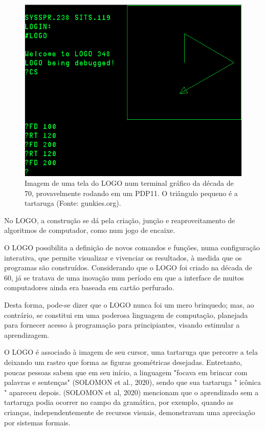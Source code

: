 \begin{figure}[htb]
\begin{minipage}[b]{0.4\linewidth}
                \includegraphics[width=1.0\linewidth]{../../../imagens/logo-PDP11.png}
                \caption{Imagem de uma tela do LOGO num terminal gráfico da década de 70, provavelmente rodando em um PDP11. O triângulo pequeno é a tartaruga (Fonte: gunkies.org).}
                \label{ca83b217b58f57e503ff496c6c6f47bee5dc77cd}
\end{minipage}
\hspace{0.5cm}
\end{figure}



No LOGO, a construção se dá pela criação, junção e reaproveitamento de algoritmos de computador, como num jogo de encaixe.

O LOGO possibilita a definição de novos comandos e funções, numa configuração interativa, que permite visualizar e vivenciar os resultados, à medida que os programas são construídos. Considerando que o LOGO foi criado na década de 60, já se tratava de uma inovação num período em que a interface de muitos computadores ainda era baseada em cartão perfurado.

Desta forma, pode-se dizer que o LOGO nunca foi um mero brinquedo; mas, ao contrário, se constitui em uma poderosa linguagem de computação, planejada para fornecer acesso à programação para principiantes, visando estimular a aprendizagem.

O LOGO é associado à imagem de seu cursor, uma tartaruga que percorre a tela deixando um rastro que forma as figuras geométricas desejadas. Entretanto, poucas pessoas sabem que em seu início, a linguagem "focava em brincar com palavras e sentenças" (SOLOMON et al., 2020), sendo que sua tartaruga " icônica " apareceu depois.  (SOLOMON et al, 2020) mencionam que o aprendizado sem a tartaruga podia ocorrer no campo da gramática, por exemplo, quando as crianças, independentemente de recursos visuais, demonstravam uma apreciação por sistemas formais.

